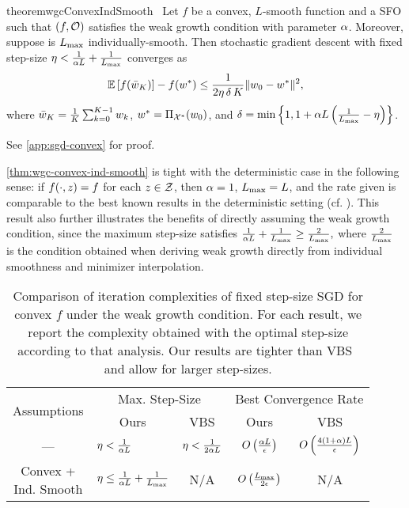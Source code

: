 \begin{restatable}{theorem}{wgcConvexIndSmooth}~\label{thm:wgc-convex-ind-smooth}
    Let \( f \) be a convex, \( L \)-smooth function and \oracle{} a \ac{SFO} such that \( \rbr{f, \oracle{}} \) satisfies the weak growth condition with parameter \( \wgc \).
    Moreover, suppose \oracle{} is \( \Lmax \) individually-smooth. 
    Then stochastic gradient descent with fixed step-size \( \eta < \frac{1}{\wgc L} + \frac{1}{\Lmax} \) converges as
    \[ \E\sbr{f(\bar w_K)} - f(\wopt) \leq \frac{1}{2\eta \, \delta \, K} \norm{\w_0 - \wopt}^2,   \]
    where \( \bar \w_K = \frac{1}{K} \sum_{k=0}^{K-1} \wk \), \( \wopt = \Pi_{\calX^*}(\w_0) \), and \( \delta = \min \cbr{ 1, 1 + \wgc L \rbr{\frac{1}{\Lmax} - \eta }} \).
\end{restatable}
\noindent See \autoref{app:sgd-convex} for proof. \hfill \break

\autoref{thm:wgc-convex-ind-smooth} is tight with the deterministic case in the following sense: if \( f(\cdot, \z) = f \) for each \( z \in \calZ \), then \( \wgc = 1 \), \( \Lmax = L \), and the rate given is comparable to the best known results in the deterministic setting (cf. \citet[Theorem 3.3]{bubeck2015convex}). 
This result also further illustrates the benefits of directly assuming the weak growth condition, since the maximum step-size satisfies 
\( \frac{1}{\wgc L} + \frac{1}{\Lmax} \geq \frac{2}{\Lmax}, \)
where \( \frac{2}{\Lmax} \) is the condition obtained when deriving weak growth directly from individual smoothness and minimizer interpolation.\\

\begin{table}[t]
    \centering
    \begin{tabular}{c l l c c  }\toprule
        \multirow{2}{*}{Assumptions} & \multicolumn{2}{c}{Max. Step-Size}  & \multicolumn{2}{c}{Best Convergence Rate}\\%
        \cmidrule(lr){2-3} \cmidrule(l){4-5}
                 & \multicolumn{1}{c}{Ours} & \multicolumn{1}{c}{VBS} & \multicolumn{1}{c}{Ours} & \multicolumn{1}{c}{VBS}\\ \midrule
    —            & \( \eta < \frac{1}{\wgc L} \)%
                 & \( \eta < \frac{1}{2 \wgc L} \)%
                 & \( O\rbr{\frac{\wgc L }{\epsilon}} \)%
                 & \( O\rbr{\frac{4 \rbr{1 + \wgc} L}{\epsilon} } \)\\ \addlinespace 
    \makecell{Convex + \\ Ind. Smooth}%
                 & \( \eta \leq \frac{1}{\wgc L} + \frac{1}{\Lmax} \)%
                 & \multicolumn{1}{c}{N/A}%
                 & \( O\rbr{\frac{\Lmax}{2 \epsilon}} \)%
                 & \multicolumn{1}{c}{N/A} \\ \bottomrule 
    \end{tabular}
    \caption{Comparison of iteration complexities of fixed step-size \ac{SGD} for convex \( f \) under the weak growth condition. For each result, we report the complexity obtained with the optimal step-size according to that analysis. Our results are tighter than VBS~\citep{vaswani2019fast} and allow for larger step-sizes.}%
    \label{table:sgd-comparison}
\end{table}


